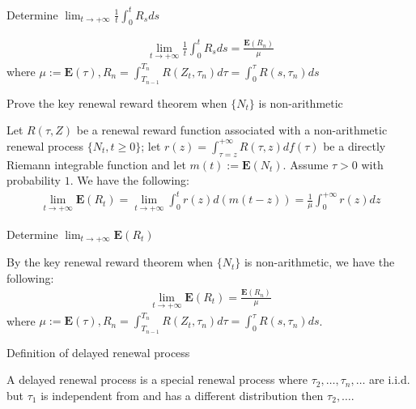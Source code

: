 \documentclass[11pt]{article}
\newcommand{\expect}[1]{\mathbf{E}(#1)}
\newcommand*{\xfield}[1]{\begin{mdframed}\centering #1\end{mdframed}\bigskip}
\newenvironment{field}{}{}
\newenvironment{note}{}{}
\begin{document}
%
\begin{note}
  \xfield{Determine \(\displaystyle \lim_{t \to +\infty} \frac{1}{t} \int_0^t R_s
    ds\)}
  \begin{field}
    \begin{align*}
      \lim_{t \to +\infty} \frac{1}{t} \int_0^t R_s ds = \frac{\expect{R_n}}{\mu}
    \end{align*}
    where \(\mu := \expect{\tau}, R_n = \displaystyle \int_{T_{n-1}}^{T_n} R(Z_t,
    \tau_n) d \tau =  \int_0^\tau R(s, \tau_n) ds\)
  \end{field}
\end{note}
%
\begin{note}
  \xfield{Prove the key renewal reward theorem when \(\{N_t\}\) is non-arithmetic}
  \begin{field}
    Let \(R(\tau, Z)\) be a renewal reward function associated with a
    non-arithmetic renewal process \(\{N_t, t \geq 0\}\); let \(r(z) =
    \int_{\tau = z}^{+\infty} R(\tau, z) d f(\tau)\) be a directly
    Riemann integrable function and let \(m(t) :=
    \expect{N_t}\). Assume \(\tau > 0\) with probability \(1\). We
    have the following:
    \begin{align*}
      \displaystyle
      \lim_{t \to +\infty} \expect{R_t} = \lim_{t \to +\infty}
      \int_0^t r(z) d( m(t-z) ) = \frac{1}{\mu} \int_0^{+\infty} r(z) dz
    \end{align*}
  \end{field}
\end{note}
%
\begin{note}
  \xfield{Determine \(\displaystyle \lim_{t \to +\infty}
    \expect{R_t}\)}
  \begin{field}
    By the key renewal reward theorem when \(\{N_t\}\) is
    non-arithmetic, we have the following:
    \begin{align*}
      \displaystyle
      \lim_{t \to +\infty} \expect{R_t} = \frac{\expect{R_n}}{\mu}
    \end{align*}
    where \(\mu := \expect{\tau}, R_n = \displaystyle \int_{T_{n-1}}^{T_n} R(Z_t,
    \tau_n) d \tau =  \int_0^\tau R(s, \tau_n) ds\).
  \end{field}
\end{note}
%
\begin{note}
  \xfield{Definition of delayed renewal process}
  \begin{field}
    A delayed renewal process is a special renewal process where
    \(\tau_2, \ldots, \tau_n, \ldots\) are i.i.d. but \(\tau_1\) is
    independent from and has a different distribution then \(\tau_2,
    \ldots\).
  \end{field}
\end{note}
\end{document}
